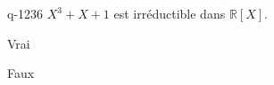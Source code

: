 \begin{truefalse}{q-1236}
$X^3+X+1$ est irréductible dans $\mathbb{R}[X]$.
\item Vrai
\item* Faux
\end{truefalse}

